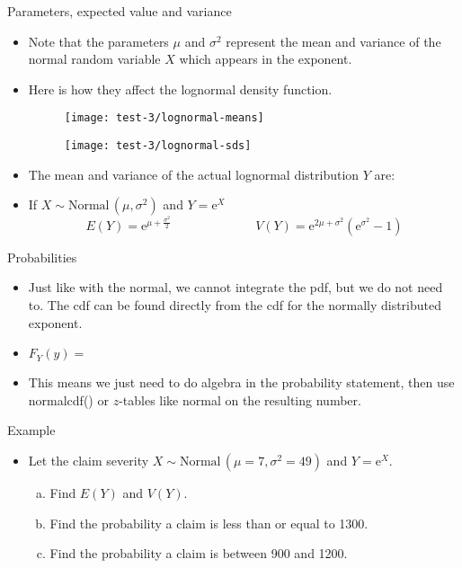 \documentclass{article}
\newcommand{\follow}[1]{\sim \text{#1}\,}		%
\newcommand{\e}{\mathrm{e}}		%
\begin{document}
Parameters, expected value and variance\bigskip
\begin{itemize}
    \item Note that the parameters $\mu$ and $\sigma^2$ represent the mean and variance of the normal random variable $X$ which appears in the exponent.
    \item Here is how they affect the lognormal density function.
    \begin{figure}[H]
       \begin{minipage}{0.45\textwidth}
            \center\texttt{[image: test-3/lognormal-means]}
        \end{minipage}
       \begin{minipage}{0.45\textwidth}
            \center\texttt{[image: test-3/lognormal-sds]}
        \end{minipage}
    \end{figure}
    \item The mean and variance of the actual lognormal distribution $Y$ are:
    \item[] If $X \follow{Normal}(\mu, \sigma^2)$ and $Y = \e^X$
    \[E(Y) = \e^{\mu + \frac{\sigma^2}{2}} \hspace{80pt} V(Y) = \e^{2\mu + \sigma^2} (\e^{\sigma^2} - 1)\]
\end{itemize}\bigskip

Probabilities\bigskip
\begin{itemize}
    \item Just like with the normal, we cannot integrate the pdf, but we do not need to. The cdf can be found directly from the cdf for the normally distributed exponent.
    \item $F_Y(y) = $\bigskip
    \item This means we just need to do algebra in the probability statement, then use \\normalcdf() or $z$-tables like normal on the resulting number.
\end{itemize}\bigskip

Example\bigskip
\begin{itemize}
    \item Let the claim severity $X \follow{Normal}(\mu = 7, \sigma^2 = 49)$ and $Y = \e^X$.
    \begin{enumerate}[(a)]
        \item Find $E(Y)$ and $V(Y)$.\vspace{30pt}
        \item Find the probability a claim is less than or equal to 1300.\vspace{100pt}
        \item Find the probability a claim is between 900 and 1200.\vspace{100pt}
    \end{enumerate}
\end{itemize}
\end{document}
